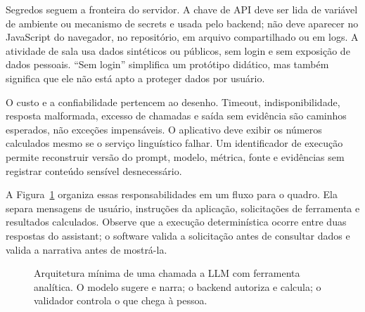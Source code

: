 Segredos seguem a fronteira do servidor. A chave de API deve ser lida de variável de ambiente ou mecanismo de secrets e usada pelo backend; não deve aparecer no JavaScript do navegador, no repositório, em arquivo compartilhado ou em logs. A atividade de sala usa dados sintéticos ou públicos, sem login e sem exposição de dados pessoais. ``Sem login'' simplifica um protótipo didático, mas também significa que ele não está apto a proteger dados por usuário.

O custo e a confiabilidade pertencem ao desenho. Timeout, indisponibilidade, resposta malformada, excesso de chamadas e saída sem evidência são caminhos esperados, não exceções impensáveis. O aplicativo deve exibir os números calculados mesmo se o serviço linguístico falhar. Um identificador de execução permite reconstruir versão do prompt, modelo, métrica, fonte e evidências sem registrar conteúdo sensível desnecessário.

A Figura~\ref{fig:aed-llm-application} organiza essas responsabilidades em um fluxo para o quadro. Ela separa mensagens de usuário, instruções da aplicação, solicitações de ferramenta e resultados calculados. Observe que a execução determinística ocorre entre duas respostas do assistant; o software valida a solicitação antes de consultar dados e valida a narrativa antes de mostrá-la.

\begin{figure}[htbp]
\centering
\small
{}
\caption{Arquitetura mínima de uma chamada a LLM com ferramenta analítica. O modelo sugere e narra; o backend autoriza e calcula; o validador controla o que chega à pessoa.}
\label{fig:aed-llm-application}
\end{figure}

